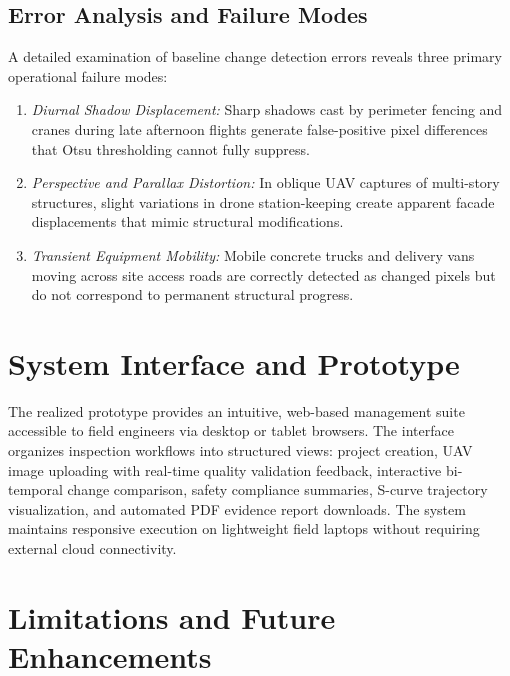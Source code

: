 \documentclass[conference]{IEEEtran}
\begin{document}
\subsection{Error Analysis and Failure Modes}
A detailed examination of baseline change detection errors reveals three primary operational failure modes:
\begin{enumerate}
    \item \textit{Diurnal Shadow Displacement:} Sharp shadows cast by perimeter fencing and cranes during late afternoon flights generate false-positive pixel differences that Otsu thresholding cannot fully suppress.
    \item \textit{Perspective and Parallax Distortion:} In oblique UAV captures of multi-story structures, slight variations in drone station-keeping create apparent facade displacements that mimic structural modifications.
    \item \textit{Transient Equipment Mobility:} Mobile concrete trucks and delivery vans moving across site access roads are correctly detected as changed pixels but do not correspond to permanent structural progress.
\end{enumerate}

\section{System Interface and Prototype}

The realized prototype provides an intuitive, web-based management suite accessible to field engineers via desktop or tablet browsers. The interface organizes inspection workflows into structured views: project creation, UAV image uploading with real-time quality validation feedback, interactive bi-temporal change comparison, safety compliance summaries, S-curve trajectory visualization, and automated PDF evidence report downloads. The system maintains responsive execution on lightweight field laptops without requiring external cloud connectivity.

\section{Limitations and Future Enhancements}
\end{document}
